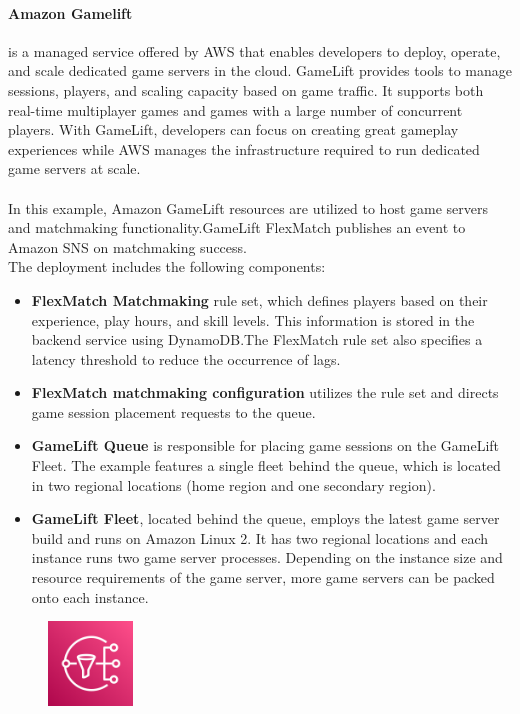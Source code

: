 \documentclass[a4paper,12pt]{report}
\begin{document}
\paragraph{Amazon Gamelift} is a managed service offered by AWS that enables developers to deploy, operate, and scale dedicated game servers in the cloud. GameLift provides tools to manage sessions, players, and scaling capacity based on game traffic. It supports both real-time multiplayer games and games with a large number of concurrent players. With GameLift, developers can focus on creating great gameplay experiences while AWS manages the infrastructure required to run dedicated game servers at scale.\\\\ 
In this example, Amazon GameLift resources are utilized to host game servers and matchmaking functionality.GameLift FlexMatch publishes an event to Amazon SNS on matchmaking success.\\ The deployment includes the following components:
\begin{itemize}
\item \textbf{FlexMatch Matchmaking} rule set, which defines players based on their experience, play hours, and skill levels. This information is stored in the backend service using DynamoDB.The FlexMatch rule set also specifies a latency threshold to reduce the occurrence of lags.

\item \textbf{FlexMatch matchmaking configuration} utilizes the rule set and directs game session placement requests to the queue.

\item \textbf{GameLift Queue} is responsible for placing game sessions on the GameLift Fleet. The example features a single fleet behind the queue, which is located in two regional locations (home region and one secondary region).

\item \textbf{GameLift Fleet}, located behind the queue, employs the latest game server build and runs on Amazon Linux 2. It has two regional locations and each instance runs two game server processes. Depending on the instance size and resource requirements of the game server, more game servers can be packed onto each instance.
\end{itemize}
\newpage


%
%
%
\begin{figure}
  \centering
  \includegraphics[width=0.2\textwidth]{img/services/SNS}
\end{figure}
%
\end{document}
